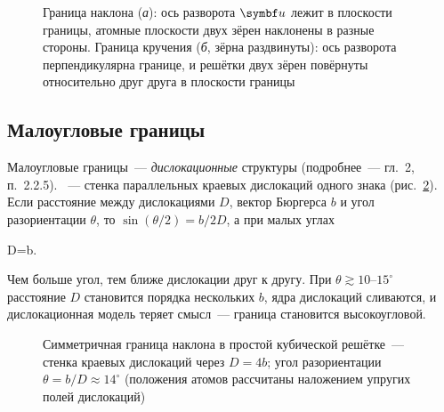 \begin{figure}[ht]
\caption{Граница наклона (\textit{а}): ось разворота $\vb u$ лежит в плоскости
границы, атомные плоскости двух зёрен наклонены в разные стороны.
Граница кручения (\textit{б}, зёрна раздвинуты): ось разворота
перпендикулярна границе, и решётки двух зёрен повёрнуты относительно друг
друга в плоскости границы}
\label{fig:tilt-twist}
\end{figure}

\subsection{Малоугловые границы}\label{ssec:low-angle}

Малоугловые границы~— \emph{дислокационные} структуры (подробнее~— гл.~2,
п.~2.2.5). ~— стенка параллельных
краевых дислокаций одного знака (рис.~\ref{fig:lab-wall}). Если расстояние
между дислокациями $D$, вектор Бюргерса $b$ и угол разориентации $\theta$,
то $\sin(\theta/2)=b/2D$, а при малых углах
\begin{keyeq}\label{eq:wall-spacing}
D=\frac b\theta .
\end{keyeq}
Чем больше угол, тем ближе дислокации друг к другу. При $\theta\gtrsim10$--$15^\circ$
расстояние $D$ становится порядка нескольких $b$, ядра дислокаций
сливаются, и дислокационная модель теряет смысл~— граница становится
высокоугловой.

\begin{figure}[ht]
\centering
{}
\caption{Симметричная граница наклона в простой кубической решётке~—
стенка краевых дислокаций через $D=4b$; угол разориентации
$\theta=b/D\approx14^\circ$ (положения атомов рассчитаны наложением упругих
полей дислокаций)}
\label{fig:lab-wall}
\end{figure}

